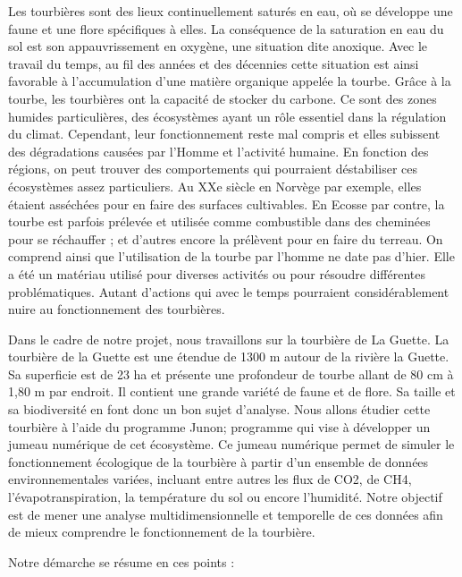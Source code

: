 \documentclass[a4paper,12pt]{report}%
\begin{document}
\begin{justify}
Les tourbières sont des lieux continuellement saturés en eau, où se développe une faune et une flore spécifiques à elles. La conséquence de la saturation en eau du sol est son appauvrissement en oxygène, une situation dite anoxique. Avec le travail du temps, au fil des années et des décennies cette situation est ainsi favorable à l’accumulation d’une matière organique appelée la tourbe. Grâce à la tourbe, les tourbières ont la capacité de stocker du carbone. Ce sont des zones humides particulières, des écosystèmes ayant un rôle essentiel dans la régulation du climat. Cependant, leur fonctionnement reste mal compris et elles subissent des dégradations causées par l’Homme et l’activité humaine. En fonction des régions, on peut trouver des comportements qui pourraient déstabiliser ces écosystèmes assez particuliers. Au XXe siècle en Norvège par exemple, elles étaient asséchées pour en faire des surfaces cultivables. En Ecosse par contre, la tourbe est parfois prélevée et utilisée comme combustible dans des cheminées pour se réchauffer ; et d’autres encore la prélèvent pour en faire du terreau. On comprend ainsi que l’utilisation de la tourbe par l’homme ne date pas d’hier. Elle a été un matériau utilisé pour diverses activités ou pour résoudre différentes problématiques.  Autant d’actions qui avec le temps pourraient considérablement nuire au fonctionnement des tourbières. \newline
					
Dans le cadre de notre  projet, nous travaillons sur la tourbière de La Guette.  La tourbière de la Guette est une étendue de 1300 m autour de la rivière la Guette. Sa superficie est de 23 ha et présente une profondeur de tourbe allant de 80 cm à 1,80 m par endroit. Il contient une grande variété de faune et de flore. Sa taille et sa biodiversité en font donc un bon sujet d’analyse.  Nous allons étudier cette tourbière à l’aide  du programme Junon; programme qui vise à développer un jumeau numérique de cet écosystème. Ce jumeau numérique permet de simuler le fonctionnement écologique de la tourbière à partir d’un ensemble de données environnementales variées, incluant entre autres les flux de CO2, de CH4, l’évapotranspiration, la température du sol ou encore l’humidité.			
Notre objectif est de mener une analyse multidimensionnelle et temporelle de ces données afin de mieux comprendre le fonctionnement de la tourbière. \newline
					
Notre démarche se résume en ces points :
					

\end{justify}
\end{document}
